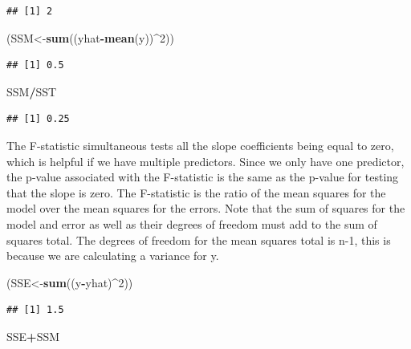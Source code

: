 \documentclass[]{book}
\newenvironment{Shaded}{\begin{snugshade}}{\end{snugshade}}
\newcommand{\KeywordTok}[1]{\textcolor[rgb]{0.13,0.29,0.53}{\textbf{#1}}}
\newcommand{\DecValTok}[1]{\textcolor[rgb]{0.00,0.00,0.81}{#1}}
\newcommand{\OperatorTok}[1]{\textcolor[rgb]{0.81,0.36,0.00}{\textbf{#1}}}
\newcommand{\NormalTok}[1]{#1}
\theoremstyle{definition}
\theoremstyle{definition}
\theoremstyle{definition}
\theoremstyle{remark}
\begin{document}
\begin{verbatim}
## [1] 2
\end{verbatim}

\begin{Shaded}
\begin{Highlighting}[]
\NormalTok{(SSM<-}\KeywordTok{sum}\NormalTok{((yhat}\OperatorTok{-}\KeywordTok{mean}\NormalTok{(y))}\OperatorTok{^}\DecValTok{2}\NormalTok{))}
\end{Highlighting}
\end{Shaded}

\begin{verbatim}
## [1] 0.5
\end{verbatim}

\begin{Shaded}
\begin{Highlighting}[]
\NormalTok{SSM}\OperatorTok{/}\NormalTok{SST}
\end{Highlighting}
\end{Shaded}

\begin{verbatim}
## [1] 0.25
\end{verbatim}

The F-statistic simultaneous tests all the slope coefficients being
equal to zero, which is helpful if we have multiple predictors. Since we
only have one predictor, the p-value associated with the F-statistic is
the same as the p-value for testing that the slope is zero. The
F-statistic is the ratio of the mean squares for the model over the mean
squares for the errors. Note that the sum of squares for the model and
error as well as their degrees of freedom must add to the sum of squares
total. The degrees of freedom for the mean squares total is n-1, this is
because we are calculating a variance for y.

\begin{Shaded}
\begin{Highlighting}[]
\NormalTok{(SSE<-}\KeywordTok{sum}\NormalTok{((y}\OperatorTok{-}\NormalTok{yhat)}\OperatorTok{^}\DecValTok{2}\NormalTok{))}
\end{Highlighting}
\end{Shaded}

\begin{verbatim}
## [1] 1.5
\end{verbatim}

\begin{Shaded}
\begin{Highlighting}[]
\NormalTok{SSE}\OperatorTok{+}\NormalTok{SSM}
\end{Highlighting}
\end{Shaded}
\end{document}
